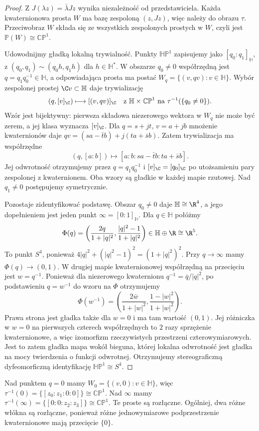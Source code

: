 \begin{proof}
Z $J(\lambda z)=\bar\lambda Jz$
wynika niezależność od przedstawiciela.
Każda kwaternionowa prosta $W$
ma bazę zespoloną $(z,Jz)$,
więc należy do obrazu $\tau$.
Przeciwobraz $W$ składa się ze wszystkich
zespolonych prostych w $W$,
czyli jest $\mathbb P(W)\cong\mathbb{CP}^1$.

Udowodnijmy gładką lokalną trywialność.
Punkty $\mathbb{HP}^1$ zapisujemy
jako $[q_0:q_1]_{\mathbb H}$, z
$(q_0,q_1)\sim(q_0h,q_1h)$
dla $h\in\mathbb H^\ast$.
W obszarze $q_0\ne0$ współrzędną jest
$q=q_1q_0^{-1}\in\mathbb H$,
a odpowiadająca prosta ma postać
$W_q=\{(v,qv):v\in\mathbb H\}$.
Wybór zespolonej prostej $\C v\subset\mathbb H$
daje trywializację
\[
 (q,[v]_\C)\longmapsto[(v,qv)]_\C
 \quad\text{z }\mathbb H\times\mathbb{CP}^1
 \text{ na }\tau^{-1}(\{q_0\ne0\}).
\]
Wzór jest bijektywny: pierwsza składowa
niezerowego wektora w $W_q$ nie może
być zerem, a jej klasa wyznacza $[v]_\C$.
Dla $q=s+jt$, $v=a+jb$ mnożenie
kwaternionów daje
$qv=(sa-\bar t b)+j(ta+\bar s b)$.
Zatem trywializacja ma współrzędne
\[
 (q,[a:b])\longmapsto
 [a:b:sa-\bar t b:ta+\bar s b].
\]
Jej odwrotność otrzymujemy przez
$q=q_1q_0^{-1}$ i $[v]_\C=[q_0]_\C$
po utożsamieniu pary zespolonej z kwaternionem.
Oba wzory są gładkie w każdej mapie
rzutowej. Nad $q_1\ne0$ postępujemy
symetrycznie.

Pozostaje zidentyfikować podstawę.
Obszar $q_0\ne0$ daje $\mathbb H\cong\R^4$,
a jego dopełnieniem jest jeden punkt
$\infty=[0:1]_{\mathbb H}$.
Dla $q\in\mathbb H$ połóżmy
\[
 \Phi(q)=
 \left(\frac{2q}{1+|q|^2},
       \frac{|q|^2-1}{1+|q|^2}\right)
       \in\mathbb H\oplus\R\cong\R^5.
\]
To punkt $S^4$, ponieważ
$4|q|^2+(|q|^2-1)^2=(1+|q|^2)^2$.
Przy $q\to\infty$ mamy
$\Phi(q)\to(0,1)$.
W drugiej mapie kwaternionowej współrzędną na przecięciu
jest $w=q^{-1}$. Ponieważ dla niezerowego kwaternionu
$q^{-1}=\bar q/|q|^2$, po podstawieniu $q=w^{-1}$
do wzoru na $\Phi$ otrzymujemy
\[
 \Phi(w^{-1})=
 \left(\frac{2\bar w}{1+|w|^2},
       \frac{1-|w|^2}{1+|w|^2}\right).
\]
Prawa strona jest gładka także dla $w=0$ i ma tam
wartość $(0,1)$. Jej różniczka w $w=0$ na pierwszych
czterech współrzędnych to $2$ razy sprzężenie
kwaternionowe, a więc izomorfizm rzeczywistych
przestrzeni czterowymiarowych. Jest to zatem gładka
mapa wokół bieguna, której lokalna odwrotność
jest gładka na mocy twierdzenia o funkcji odwrotnej.
Otrzymujemy stereograficzną
dyfeomorficzną identyfikację
$\mathbb{HP}^1\cong S^4$.
\end{proof}

\begin{przyklad}
\label{prz:lin32-wlokna}
Nad punktem $q=0$ mamy
$W_0=\{(v,0):v\in\mathbb H\}$,
więc
$\tau^{-1}(0)=\{[z_0:z_1:0:0]\}\cong\mathbb{CP}^1$.
Nad $\infty$ mamy
$\tau^{-1}(\infty)=\{[0:0:z_2:z_3]\}\cong\mathbb{CP}^1$.
Te proste są rozłączne. Ogólniej,
dwa różne włókna są rozłączne,
ponieważ różne jednowymiarowe
podprzestrzenie kwaternionowe
mają przecięcie $\{0\}$.
\end{przyklad}

